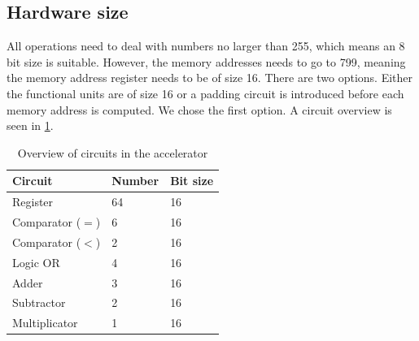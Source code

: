 \documentclass[a4paper, english]{article}
\numberwithin{equation}{section}
\begin{document}
\subsection{Hardware size}
All operations need to deal with numbers no larger than 255, which means an 8 bit size is suitable. However, the memory addresses needs to go to 799, meaning the memory address register needs to be of size 16. There are two options. Either the functional units are of size 16 or a padding circuit is introduced before each memory address is computed. We chose the first option. A circuit overview is seen in \cref{tbl:circuits}.
\begin{table}[H]
    \centering
    \caption{Overview of circuits in the accelerator}\label{tbl:circuits}
    \begin{tabular}{lll}
        \toprule
        Circuit            & Number & Bit size \\
        \midrule
        Register           & 64     & 16       \\
        Comparator (\(=\)) & 6      & 16       \\
        Comparator (\(<\)) & 2      & 16       \\
        Logic OR           & 4      & 16       \\
        Adder              & 3      & 16       \\
        Subtractor         & 2      & 16       \\
        Multiplicator      & 1      & 16       \\
        \bottomrule
    \end{tabular}
\end{table}

%
%




%
\end{document}
